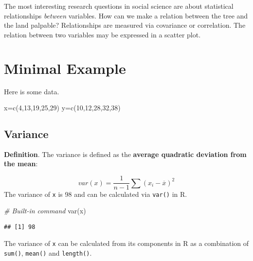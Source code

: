 \documentclass[
]{book}
\newenvironment{Shaded}{\begin{snugshade}}{\end{snugshade}}
\newcommand{\CommentTok}[1]{\textcolor[rgb]{0.56,0.35,0.01}{\textit{#1}}}
\newcommand{\DecValTok}[1]{\textcolor[rgb]{0.00,0.00,0.81}{#1}}
\newcommand{\FunctionTok}[1]{\textcolor[rgb]{0.00,0.00,0.00}{#1}}
\newcommand{\NormalTok}[1]{#1}
\newcommand{\OtherTok}[1]{\textcolor[rgb]{0.56,0.35,0.01}{#1}}
\begin{document}
The most interesting research questions in social science are about statistical relationships \emph{between} variables. How can we make a relation between the tree and the land palpable? Relationships are measured via covariance or correlation. The relation between two variables may be expressed in a scatter plot.

\hypertarget{minimal-example}{%
\section{Minimal Example}\label{minimal-example}}

Here is some data.

\begin{Shaded}
\begin{Highlighting}[]
\NormalTok{x}\OtherTok{=}\FunctionTok{c}\NormalTok{(}\DecValTok{4}\NormalTok{,}\DecValTok{13}\NormalTok{,}\DecValTok{19}\NormalTok{,}\DecValTok{25}\NormalTok{,}\DecValTok{29}\NormalTok{)}
\NormalTok{y}\OtherTok{=}\FunctionTok{c}\NormalTok{(}\DecValTok{10}\NormalTok{,}\DecValTok{12}\NormalTok{,}\DecValTok{28}\NormalTok{,}\DecValTok{32}\NormalTok{,}\DecValTok{38}\NormalTok{)}
\end{Highlighting}
\end{Shaded}

\hypertarget{variance}{%
\subsection{Variance}\label{variance}}

\textbf{Definition}. The variance is defined as the \textbf{average quadratic deviation from the mean}:

\[var(x) = \frac{1}{n-1} \sum (x_i - \overline{x} )^2\]
The variance of \texttt{x} is 98 and can be calculated via \texttt{var()} in R.

\begin{Shaded}
\begin{Highlighting}[]
\CommentTok{\# Built{-}in command}
\FunctionTok{var}\NormalTok{(x)}
\end{Highlighting}
\end{Shaded}

\begin{verbatim}
## [1] 98
\end{verbatim}

The variance of \texttt{x} can be calculated from its components in R as a combination of \texttt{sum()}, \texttt{mean()} and \texttt{length()}.
\end{document}
